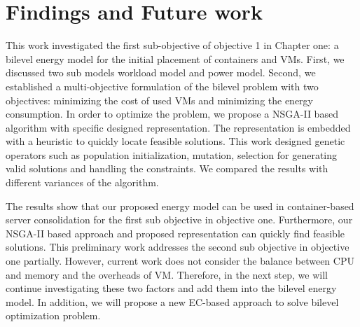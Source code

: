 \section{Findings and Future work}
\label{sec:con}

This work investigated the first sub-objective of objective 1 in Chapter one: a bilevel energy model for the initial placement of containers and VMs. First, we discussed two sub models workload model and power model. Second, we established a multi-objective formulation of the bilevel problem with two objectives: minimizing the cost of used VMs and minimizing the energy consumption. In order to optimize the problem, we propose a NSGA-II based algorithm with specific designed representation. The representation is embedded with a heuristic to quickly locate feasible solutions. This work designed genetic operators such as population initialization, mutation, selection for generating valid solutions and handling the constraints. We compared the results with different variances of the algorithm. 

The results show that our proposed energy model can be used in container-based server consolidation for the first sub objective in objective one. Furthermore, our NSGA-II based approach and proposed representation can quickly find feasible solutions. This preliminary work addresses the second sub objective in objective one partially. However, current work does not consider the balance between CPU and memory and the overheads of VM. Therefore, in the next step, we will continue investigating these two factors and add them into the bilevel energy model. In addition, we will propose a new EC-based approach to solve bilevel optimization problem.

